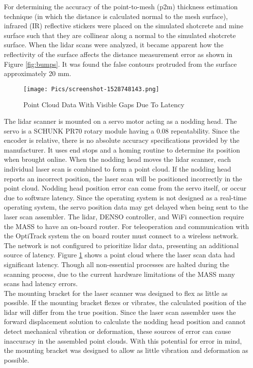 For determining the accuracy of the point-to-mesh (\acrshort{p2m}) thickness estimation technique (in which the distance is calculated normal to the mesh surface), infrared (IR) reflective stickers were placed on the simulated shotcrete and mine surface such that they are collinear along a normal to the simulated shotcrete surface. When the \acrshort{lidar} scans were analyzed, it became apparent how the reflectivity of the surface affects the distance measurement error as shown in Figure \ref{fig:bumps}. It was found the false contours protruded from the surface approximately 20 mm.\\

\begin{figure}
    \centering
    \texttt{[image: Pics/screenshot-1528748143.png]}
    \caption{Point Cloud Data With Visible Gaps Due To Latency}
    \label{fig:headlag}
\end{figure}
The \acrshort{lidar} scanner is mounted on a servo motor acting as a nodding head. The servo is a SCHUNK PR70 rotary module having a 0.08\degree\hspace{0pt} repeatability. Since the encoder is relative, there is no absolute accuracy specifications provided by the manufacturer. It uses end stops and a homing routine to determine its position when brought online. When the nodding head moves the \acrshort{lidar} scanner, each individual laser scan is combined to form a point cloud. If the nodding head reports an incorrect position, the laser scan will be positioned incorrectly in the point cloud. Nodding head position error can come from the servo itself, or occur due to software latency. Since the operating system is not designed as a real-time operating system, the servo position data may get delayed when being sent to the laser scan assembler. The \acrshort{lidar}, DENSO controller, and WiFi connection require the MASS to have an on-board router. For teleoperation and communication with the OptiTrack system the on board router must connect to a wireless network. The network is not configured to prioritize \acrshort{lidar} data, presenting an additional source of latency. Figure \ref{fig:headlag} shows a point cloud where the laser scan data had significant latency. Though all non-essential processes are halted during the scanning process, due to the current hardware limitations of the MASS many scans had latency errors.\\

The mounting bracket for the laser scanner was designed to flex as little as possible. If the mounting bracket flexes or vibrates, the calculated position of the \acrshort{lidar} will differ from the true position. Since the laser scan assembler uses the forward displacement solution to calculate the nodding head position and cannot detect mechanical vibration or deformation, these sources of error can cause inaccuracy in the assembled point clouds. With this potential for error in mind, the mounting bracket was designed to allow as little vibration and deformation as possible.\\

